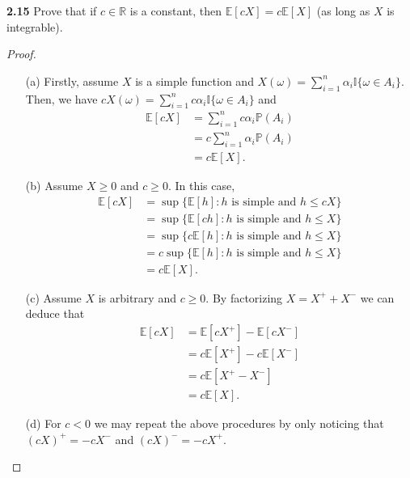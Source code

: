 \noindent\textbf{2.15} Prove that if $c \in \mathbb{R}$ is a constant, then $\mathbb{E}[c X]=c \mathbb{E}[X]$ (as long as $X$ is integrable).
\begin{proof}
    \begin{enumerate}
        \item[(a)] Firstly, assume $X$ is a simple function and $X(\omega) = \sum_{i=1}^n \alpha_i \mathbb{I}\{\omega \in A_i\}$.
        Then, we have $cX(\omega) = \sum_{i=1}^n c \alpha_i \mathbb{I}\{\omega \in A_i\}$ and
        \begin{equation*}
            \begin{aligned}
                \mathbb{E}[cX]
                &= \sum_{i=1}^n c \alpha_i \mathbb{P}(A_i)\\
                &= c \sum_{i=1}^n \alpha_i \mathbb{P}(A_i)\\
                &= c \mathbb{E}[X].
            \end{aligned}
        \end{equation*}
        \item[(b)] Assume $X \geq 0$ and $c \geq 0$. In this case, 
        \begin{equation*}
            \begin{aligned}
                \mathbb{E}[cX]
                &= \sup \{\mathbb{E}[h]: h \text{ is simple and } h \leq cX\}\\
                &= \sup \{\mathbb{E}[ch]: h \text{ is simple and } h \leq X\}\\
                &= \sup \{c\mathbb{E}[h]: h \text{ is simple and } h \leq X\}\\
                &= c\sup \{\mathbb{E}[h]: h \text{ is simple and } h \leq X\}\\
                &= c \mathbb{E}[X].
            \end{aligned}
        \end{equation*}

        \item[(c)] Assume $X$ is arbitrary and $c \geq 0$.
        By factorizing $X = X^+ + X^-$ we can deduce that 
        \begin{equation*}
            \begin{aligned}
                \mathbb{E}[cX]
                &= \mathbb{E}[cX^+] - \mathbb{E}[cX^-]\\
                &= c\mathbb{E}[X^+] - c\mathbb{E}[X^-]\\
                &= c\mathbb{E}[X^+ - X^-]\\
                &= c\mathbb{E}[X].
            \end{aligned}
        \end{equation*}
        
        \item[(d)] For $c < 0$ we may repeat the above procedures by only noticing that $(cX)^+ = -cX^-$ and $(cX)^- = -cX^+$.
    \end{enumerate}
\end{proof}

